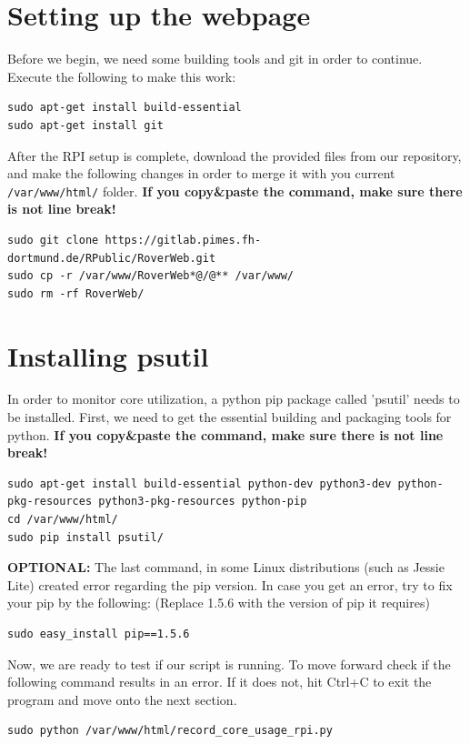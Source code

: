 \section{Setting up the webpage}
Before we begin, we need some building tools and git in order to continue. Execute the following to make this work:\textit{}
\begin{lstlisting}
sudo apt-get install build-essential
sudo apt-get install git
\end{lstlisting}
After the RPI setup is complete, download the provided files from our repository, and make the following changes in order to merge it with you current \texttt{/var/www/html/} folder. \textbf{If you copy\&paste the command, make sure there is not line break!}
\begin{lstlisting}
sudo git clone https://gitlab.pimes.fh-dortmund.de/RPublic/RoverWeb.git
sudo cp -r /var/www/RoverWeb*@/@** /var/www/
sudo rm -rf RoverWeb/
\end{lstlisting}
\section{Installing psutil}
In order to monitor core utilization, a python pip package called 'psutil' needs to be installed. First, we need to get the essential building and packaging tools for python. \textbf{If you copy\&paste the command, make sure there is not line break!}
\begin{lstlisting}
sudo apt-get install build-essential python-dev python3-dev python-pkg-resources python3-pkg-resources python-pip
cd /var/www/html/
sudo pip install psutil/
\end{lstlisting}
\textbf{OPTIONAL:} The last command, in some Linux distributions (such as Jessie Lite) created error regarding the pip version. In case you get an error, try to fix your pip by the following: (Replace 1.5.6 with the version of pip it requires) 
\begin{lstlisting}
sudo easy_install pip==1.5.6
\end{lstlisting}
Now, we are ready to test if our script is running. To move forward check if the following command results in an error. If it does not, hit Ctrl+C to exit the program and move onto the next section.
\begin{lstlisting}
sudo python /var/www/html/record_core_usage_rpi.py
\end{lstlisting}
